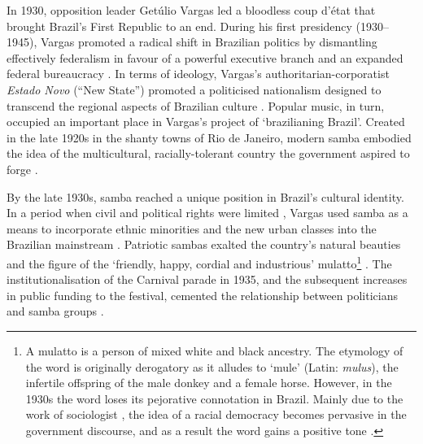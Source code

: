 \documentclass[a4paper,12pt]{article}
\begin{document}
In 1930, opposition leader Getúlio Vargas led a bloodless coup d'état that brought Brazil's First Republic to an end. During his first presidency (1930--1945), Vargas promoted a radical shift in Brazilian politics by dismantling effectively federalism in favour of a powerful executive branch and an expanded federal bureaucracy \citep[e.g.][]{bethell2008politicsvargas,desouza1983estado,fausto1972revoluccao,fausto2014concise,skidmore1967politics}. In terms of ideology, Vargas's authoritarian-corporatist \emph{Estado Novo} (``New State'') promoted a politicised nationalism designed to transcend the regional aspects of Brazilian culture \citep{lauerhass1972getulio,nava1998lessons,williams2001culture}. Popular music, in turn, occupied an important place in Vargas's project of `brazilianing Brazil'. Created in the late 1920s in the shanty towns of Rio de Janeiro, modern samba embodied the idea of the multicultural, racially-tolerant country the government aspired to forge \citep{avelar2011brazilian,mccann2004hello,stockler2011samba,vassberg1969villa,vassberg1975villa}.

By the late 1930s, samba reached a unique position in Brazil's cultural identity. In a period when civil and political rights were limited \citep{de2001cidadania,duarte1993vicissitudes}, Vargas used samba as a means to incorporate ethnic minorities and the new urban classes into the Brazilian mainstream \citep[213]{chinelli1993vazio}. Patriotic sambas exalted the country's natural beauties and the figure of the `friendly, happy, cordial and industrious' mulatto\footnote{A mulatto is a person of mixed white and black ancestry. The etymology of the word is originally derogatory as it alludes to `mule' (Latin: \emph{mulus}), the infertile offspring of the male donkey and a female horse. However, in the 1930s the word loses its pejorative connotation in Brazil. Mainly due to the work of sociologist \citet{freyre1933casa}, the idea of a racial democracy becomes pervasive in the government discourse, and as a result the word gains a positive tone \citep[4]{reiter2009brazil}.} \citetext{\citealp[47]{dangelo2016samba}; \citealp[51]{vianna1995misterio}}. The institutionalisation of the Carnival parade in 1935, and the subsequent increases in public funding to the festival, cemented the relationship between politicians and samba groups \citep{almeida2017carnaval,cabral2016escolas,soihet1998subversao}.
\end{document}
